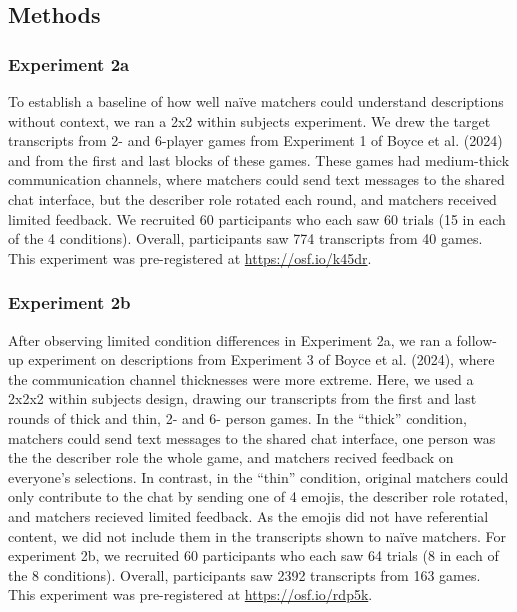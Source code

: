 \documentclass[10pt, letterpaper]{article}
\begin{document}
\subsection{Methods}\label{methods-1}

\subsubsection{Experiment 2a}\label{experiment-2a}

To establish a baseline of how well naïve matchers could understand
descriptions without context, we ran a 2x2 within subjects experiment.
We drew the target transcripts from 2- and 6-player games from
Experiment 1 of Boyce et al. (2024) and from the first and last blocks
of these games. These games had medium-thick communication channels,
where matchers could send text messages to the shared chat interface,
but the describer role rotated each round, and matchers received limited
feedback. We recruited 60 participants who each saw 60 trials (15 in
each of the 4 conditions). Overall, participants saw 774 transcripts
from 40 games. This experiment was pre-registered at
\url{https://osf.io/k45dr}.

\subsubsection{Experiment 2b}\label{experiment-2b}

After observing limited condition differences in Experiment 2a, we ran a
follow-up experiment on descriptions from Experiment 3 of Boyce et al.
(2024), where the communication channel thicknesses were more extreme.
Here, we used a 2x2x2 within subjects design, drawing our transcripts
from the first and last rounds of thick and thin, 2- and 6- person
games. In the ``thick'' condition, matchers could send text messages to
the shared chat interface, one person was the the describer role the
whole game, and matchers recived feedback on everyone's selections. In
contrast, in the ``thin'' condition, original matchers could only
contribute to the chat by sending one of 4 emojis, the describer role
rotated, and matchers recieved limited feedback. As the emojis did not
have referential content, we did not include them in the transcripts
shown to naïve matchers. For experiment 2b, we recruited 60 participants
who each saw 64 trials (8 in each of the 8 conditions). Overall,
participants saw 2392 transcripts from 163 games. This experiment was
pre-registered at \url{https://osf.io/rdp5k}.
\end{document}
